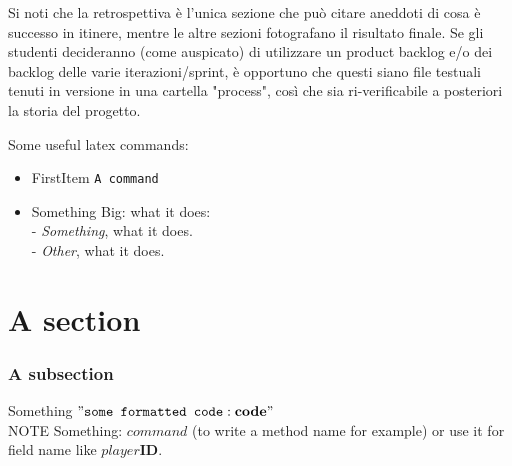 \documentclass[10pt,english]{article}
\begin{document}
Si noti che la retrospettiva è l'unica sezione che può citare aneddoti di cosa è successo in itinere, mentre le altre sezioni fotografano il risultato finale. Se gli studenti decideranno (come auspicato) di utilizzare un product backlog e/o dei backlog delle varie iterazioni/sprint, è opportuno che questi siano file testuali tenuti in versione in una cartella "process", così che sia ri-verificabile a posteriori la storia del progetto.\\


















\newpage

Some useful latex commands:\\

\begin{itemize}
\item FirstItem  \texttt{A command}\\


\item Something Big: what it does: \\
- \textit{Something}, what it does.\\
- \textit{Other}, what it does.

\end{itemize}

\section*{A section}

\subsubsection*{A subsection}
Something $"\texttt{some formatted code}:\textbf{code}"$\\

NOTE Something: $command$ (to write a method name for example) or use it for field name like $player\textbf{ID}$. 
\end{document}
